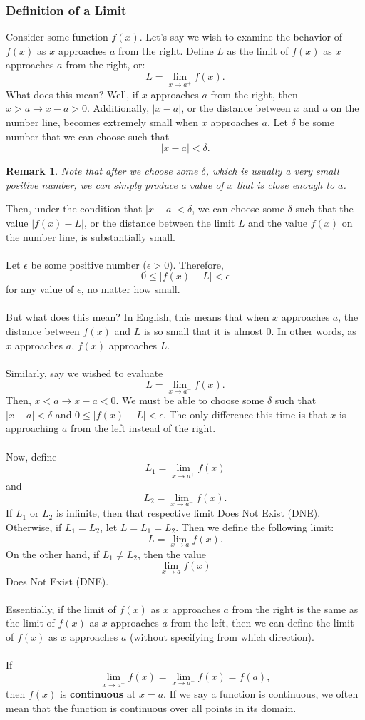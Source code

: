 \documentclass{article}
\newtheorem*{remark}{Remark}
\begin{document}
\subsubsection{Definition of a Limit}
Consider some function $f(x)$. Let's say we wish to examine the behavior of $f(x)$ as $x$ approaches $a$ from the right. Define $L$ as the limit of $f(x)$ as $x$ approaches $a$ from the right, or:
\[L=\lim_{x\to a^+} f(x).\]
What does this mean? Well, if $x$ approaches $a$ from the right, then $x>a\to x-a>0$. Additionally, $\left|x-a\right|$, or the distance between $x$ and $a$ on the number line, becomes extremely small when $x$ approaches $a$. Let $\delta$ be some number that we can choose such that
\[\left|x-a\right|<\delta.\]
\begin{remark}
Note that after we choose some $\delta$, which is usually a \textit{very} small positive number, we can simply produce a value of $x$ that is close enough to $a$. 
\end{remark}
Then, under the condition that $\left|x-a\right|<\delta$, we can choose some $\delta$ such that the value $\left|f(x)-L\right|$, or the distance between the limit $L$ and the value $f(x)$ on the number line, is substantially small. 
\\
\\
Let $\epsilon$ be some positive number ($\epsilon>0$). Therefore, \[0\leq\left|f(x)-L\right|<\epsilon\] 
for any value of $\epsilon$, no matter how small. 
\\
\\
But what does this mean? In English, this means that when $x$ approaches $a$, the distance between $f(x)$ and $L$ is so small that it is almost 0. In other words, as $x$ approaches $a$, $f(x)$ approaches $L$. 
\\
\\
Similarly, say we wished to evaluate 
\[L=\lim_{x\to a^-} f(x).\]
Then, $x<a\to x-a<0$. We must be able to choose some $\delta$ such that $\left|x-a\right|<\delta$ and $0\leq\left|f(x)-L\right|<\epsilon$. The only difference this time is that $x$ is approaching $a$ from the left instead of the right.
\\
\\
Now, define 
\[L_1=\lim_{x\to a^+} f(x)\]
and 
\[L_2=\lim_{x\to a^-} f(x).\]
If $L_1$ or $L_2$ is infinite, then that respective limit Does Not Exist (DNE). Otherwise, if $L_1=L_2$, let $L=L_1=L_2$. Then we define the following limit:
\[L=\lim_{x\to a} f(x).\]
On the other hand, if $L_1\neq L_2$, then the value
\[\lim_{x\to a} f(x)\]
Does Not Exist (DNE).
\\
\\
Essentially, if the limit of $f(x)$ as $x$ approaches $a$ from the right is the same as the limit of $f(x)$ as $x$ approaches $a$ from the left, then we can define the limit of $f(x)$ as $x$ approaches $a$ (without specifying from which direction).
\\
\\
If 
\[\lim_{x\to a^+} f(x)=\lim_{x\to a^-} f(x)=f(a),\]
then $f(x)$ is \textbf{continuous} at $x=a$. If we say a function is continuous, we often mean that the function is continuous over all points in its domain. 
\end{document}
